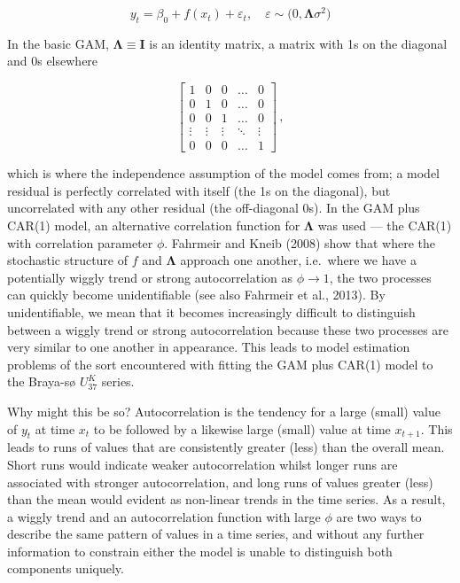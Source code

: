\documentclass[12pt,]{article}
\newcommand{\uk}{\ensuremath{\mathit{U}^{\mathit{K}}_{\mathup{37}}}}
\begin{document}
\begin{equation}
y_t = \beta_0 + f(x_t) + \varepsilon_t, \quad \varepsilon \sim \mathcal(0, \boldsymbol{\Lambda}\sigma^2)
\end{equation}

In the basic GAM, \(\boldsymbol{\Lambda} \equiv \mathbf{I}\) is an
identity matrix, a matrix with 1s on the diagonal and 0s elsewhere

\begin{equation*}
\begin{bmatrix}
1      & 0 & 0 & \dots & 0 \\
0      & 1 & 0 & \dots & 0 \\
0      & 0 & 1 & \dots & 0 \\
\vdots & \vdots & \vdots & \ddots & \vdots \\
0      & 0 & 0 & \dots & 1
\end{bmatrix}\, ,
\end{equation*}

which is where the independence assumption of the model comes from; a
model residual is perfectly correlated with itself (the 1s on the
diagonal), but uncorrelated with any other residual (the off-diagonal
0s). In the GAM plus CAR(1) model, an alternative correlation function
for \(\boldsymbol{\Lambda}\) was used --- the CAR(1) with correlation
parameter \(\phi\). Fahrmeir and Kneib (2008) show that where the
stochastic structure of \(f\) and \(\boldsymbol{\Lambda}\) approach one
another, i.e.~where we have a potentially wiggly trend or strong
autocorrelation as \(\phi \rightarrow 1\), the two processes can quickly
become unidentifiable (see also Fahrmeir et al., 2013). By
unidentifiable, we mean that it becomes increasingly difficult to
distinguish between a wiggly trend or strong autocorrelation because
these two processes are very similar to one another in appearance. This
leads to model estimation problems of the sort encountered with fitting
the GAM plus CAR(1) model to the Braya-sø \uk{} series.

Why might this be so? Autocorrelation is the tendency for a large
(small) value of \(y_t\) at time \(x_t\) to be followed by a likewise
large (small) value at time \(x_{t+1}\). This leads to runs of values
that are consistently greater (less) than the overall mean. Short runs
would indicate weaker autocorrelation whilst longer runs are associated
with stronger autocorrelation, and long runs of values greater (less)
than the mean would evident as non-linear trends in the time series. As
a result, a wiggly trend and an autocorrelation function with large
\(\phi\) are two ways to describe the same pattern of values in a time
series, and without any further information to constrain either the
model is unable to distinguish both components uniquely.
\end{document}
